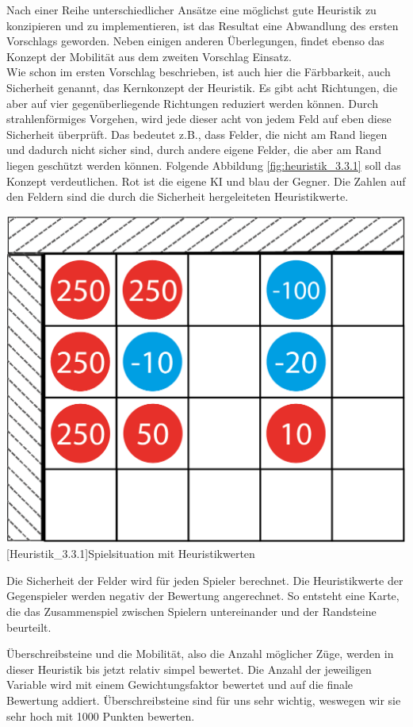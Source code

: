 \documentclass[12pt,a4paper,bibliography=totocnumbered,listof=totocnumbered]{scrartcl}
\begin{document}
	Nach einer Reihe unterschiedlicher Ansätze eine möglichst gute Heuristik zu konzipieren und zu implementieren, ist das Resultat eine Abwandlung des ersten Vorschlags geworden. Neben einigen anderen Überlegungen, findet ebenso das Konzept der Mobilität aus dem zweiten Vorschlag Einsatz.\\
	Wie schon im ersten Vorschlag beschrieben, ist auch hier die \glqq Färbbarkeit\grqq, auch \glqq Sicherheit\grqq{}  genannt, das Kernkonzept der Heuristik. Es gibt acht Richtungen, die aber auf vier gegenüberliegende Richtungen reduziert werden können. Durch strahlenförmiges Vorgehen, wird jede dieser acht von jedem Feld auf eben diese \glqq Sicherheit\grqq{}  überprüft. Das bedeutet z.B., dass Felder, die nicht am Rand liegen und dadurch nicht sicher sind, durch andere eigene Felder, die aber am Rand liegen geschützt werden können. Folgende Abbildung  \ref{fig:heuristik_3.3.1} soll das Konzept verdeutlichen. Rot ist die eigene KI und blau der Gegner. Die Zahlen auf den Feldern sind die durch die \glqq Sicherheit\grqq{} hergeleiteten Heuristikwerte.
	
	\vspace{1em}
	\begin{minipage}{\linewidth}
		\centering
		\includegraphics[width=0.4\linewidth]{pics/Kapitel_3/Kapitel_3_pic5.png}
		[Heuristik_3.3.1]{Spielsituation mit Heuristikwerten\footnotemark }
		\label{fig:heuristik_3.3.1}
	\end{minipage}

	Die \glqq Sicherheit\grqq{} der Felder wird für jeden Spieler berechnet. Die Heuristikwerte der Gegenspieler werden negativ der Bewertung angerechnet. So entsteht eine Karte, die das Zusammenspiel zwischen Spielern untereinander und der Randsteine beurteilt.
	
	Überschreibsteine und die Mobilität, also die Anzahl möglicher Züge, werden in dieser Heuristik bis jetzt relativ simpel bewertet. Die Anzahl der jeweiligen Variable wird mit einem Gewichtungsfaktor bewertet und auf die finale Bewertung addiert. Überschreibsteine sind für uns sehr wichtig, weswegen wir sie sehr hoch mit 1000 Punkten bewerten.
	
\end{document}
